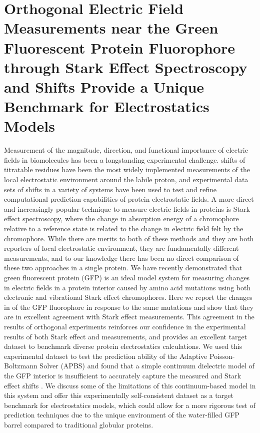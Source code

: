 \chapter{Orthogonal Electric Field Measurements near the Green Fluorescent Protein Fluorophore through Stark Effect Spectroscopy and \pKa{} Shifts Provide a Unique Benchmark for Electrostatics Models} \label{gfp-pKa}

Measurement of the magnitude, direction, and functional importance of electric fields in biomolecules has been a longstanding experimental challenge. 
\pKa{} shifts of titratable residues have been the most widely implemented measurements of the local electrostatic environment around the labile proton, and experimental data sets of \pKa{} shifts in a variety of systems have been used to test and refine computational prediction capabilities of protein electrostatic fields. 
A more direct and increasingly popular technique to measure electric fields in proteins is Stark effect spectroscopy, where the change in absorption energy of a chromophore relative to a reference state is related to the change in electric field felt by the chromophore. While there are merits to both of these methods and they are both reporters of local electrostatic environment, they are fundamentally different measurements, and to our knowledge there has been no direct comparison of these two approaches in a single protein. 
We have recently demonstrated that green fluorescent protein (GFP) is an ideal model system for measuring changes in electric fields in a protein interior caused by amino acid mutations using both electronic and vibrational Stark effect chromophores. 
Here we report the changes in \pKa{} of the GFP fluorophore in response to the same mutations and show that they are in excellent agreement with Stark effect measurements. 
This agreement in the results of orthogonal experiments reinforces our confidence in the experimental results of both Stark effect and \pKa{} measurements, and provides an excellent target dataset to benchmark diverse protein electrostatics calculations. 
We used this experimental dataset to test the \pKa{} prediction ability of the Adaptive Poisson-Boltzmann Solver (APBS) and found that a simple continuum dielectric model of the GFP interior is insufficient to accurately capture the measured \pKa{} and Stark effect shifts . 
We discuss some of the limitations of this continuum-based model in this system and offer this experimentally self-consistent dataset as a target benchmark for electrostatics models, which could allow for a more rigorous test of \pKa{} prediction techniques due to the unique environment of the water-filled GFP barrel compared to traditional globular proteins.


